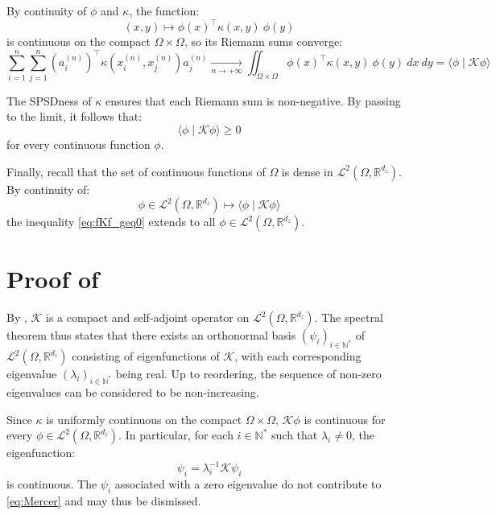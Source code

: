 By continuity of $\phi$ and $\kappa$, the function:
\begin{equation}
	(x,y)\mapsto \phi(x)^\top \kappa(x,y)\:\phi(y)
\end{equation}
is continuous on the compact $\Omega\times\Omega$, so its Riemann sums converge:
\begin{equation}
	\sum_{i=1}^n\sum_{j=1}^n\left(a_i^{(n)}\right)^\top \kappa\left(x_i^{(n)},x_j^{(n)}\right)a_j^{(n)}\underset{n\to+\infty}{\longrightarrow}\iint_{\Omega\times\Omega}{\phi(x)^\top \kappa(x,y)\:\phi(y)\:dx\:dy}=\langle\phi\mid\mathcal{K}\phi\rangle
\end{equation}

The SPSDness of $\kappa$ ensures that each Riemann sum is non-negative. By passing to the limit, it follows that:
\begin{equation}
	\langle\phi\mid\mathcal{K}\phi\rangle\geq0\label{eq:fKf_geq0}
\end{equation}
for every continuous function $\phi$.

Finally, recall that the set of continuous functions of $\Omega$ is dense in $\mathcal{L}^2(\Omega,\mathbb{R}^{d_z})$. By continuity of:
\begin{equation}
	\phi\in\mathcal{L}^2(\Omega,\mathbb{R}^{d_z})\mapsto\langle\phi\mid\mathcal{K}\phi\rangle
\end{equation}
the inequality \eqref{eq:fKf_geq0} extends to all $\phi\in\mathcal{L}^2(\Omega,\mathbb{R}^{d_z})$.

\section[Proof of Proposition 3.16]{Proof of }\label{sec:proof_Mercer}

By , $\mathcal{K}$ is a compact and self-adjoint operator on $\mathcal{L}^2(\Omega,\mathbb{R}^{d_z})$. The spectral theorem \cite{bib:spectral-theorem} thus states that there exists an orthonormal basis $(\psi_i)_{i\in\mathbb{N}^*}$ of $\mathcal{L}^2(\Omega,\mathbb{R}^{d_z})$ consisting of eigenfunctions of $\mathcal{K}$, with each corresponding eigenvalue $(\lambda_i)_{i\in\mathbb{N}^*}$ being real. Up to reordering, the sequence of non-zero eigenvalues can be considered to be non-increasing.

Since $\kappa$ is uniformly continuous on the compact $\Omega\times\Omega$, $\mathcal{K}\phi$ is continuous for every $\phi\in\mathcal{L}^2(\Omega,\mathbb{R}^{d_z})$. In particular, for each $i\in\mathbb{N}^*$ such that $\lambda_i\neq0$, the eigenfunction:
\begin{equation}
	\psi_i=\lambda_i^{-1}\mathcal{K}\psi_i
\end{equation}
is continuous. The $\psi_i$ associated with a zero eigenvalue do not contribute to \eqref{eq:Mercer} and may thus be dismissed.

